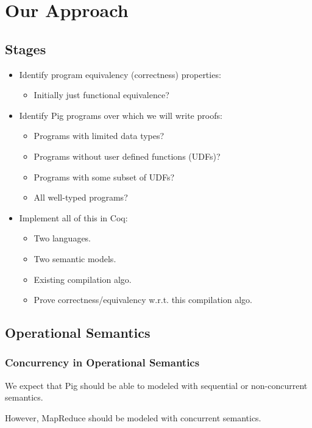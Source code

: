 \section{Our Approach}
\subsection{Stages}
\begin{frame}
\begin{itemize}
  \frametitle{Stages of Project Development}

  \item Identify program equivalency (correctness) properties:
  \begin{itemize}
    \item Initially just functional equivalence?
  \end{itemize}

  \item Identify Pig programs over which we will write proofs:
  \begin{itemize}
    \item Programs with limited data types?
    \item Programs without user defined functions (UDFs)?
    \item Programs with some subset of UDFs?
    \item All well-typed programs?
  \end{itemize}

  \item Implement all of this in Coq:
  \begin{itemize}
    \item Two languages.
    \item Two semantic models.
    \item Existing compilation algo.
    \item Prove correctness/equivalency w.r.t. this compilation algo.
  \end{itemize}

\end{itemize}
\end{frame}

\subsection{Operational Semantics}
\begin{frame}
  \frametitle{Concurrency in Operational Semantics}
  We expect that Pig should be able to modeled with sequential or non-concurrent
  semantics.

  However, MapReduce should be modeled with concurrent semantics.
\end{frame}

